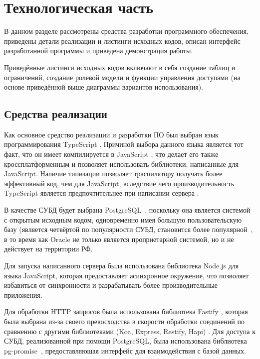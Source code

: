 \section{\large Технологическая часть}

В  данном  разделе  рассмотрены  средства  разработки  программного
обеспечения, приведены детали реализации и листинги исходных кодов, описан интерфейс разработанной программы и приведена демонстрация работы.

Приведённые листинги исходных кодов включают в себя создание таблиц и ограничений, создание ролевой модели и функции управления доступами (на основе приведённой выше диаграммы вариантов использования).

\subsection{Средства реализации}
Как  основное  средство  реализации  и  разработки  ПО  был  выбран  язык программирования  TypeScript \cite{ts}.
Причиной  выбора  данного  языка  является  тот факт,  что  он  имеет компилируется в JavaScript \cite{js}, что делает его также кроссплатформенным и позволяет использовать библиотеки, написанные для JavaScript.
Наличие типизации позволяет траспилятору получать более эффективный код, чем для JavaScript, вследствие чего производительность TypeScript является предпочтительнее при написании сервера \cite{ts-vs-js}.

В качестве СУБД будет выбрана PostgreSQL~\cite{postgres}, поскольку она является системой с открытым исходным кодом, одновременно имея большую пользовательскую базу (является четвёртой по популярности СУБД, становится более популярной~\cite{db-engine}, в то время как Oracle не только является проприетарной системой, но и не действует на территории РФ. 

Для запуска написанного сервера была использована библиотека Node.js \cite{nodejs} для языка JavaScript, которая предоставляет асинхронное окружение, что позволяет избавиться от синхронности и разрабатывать более производительные приложения.

Для обработки HTTP запросов была использована библиотека Fastify \cite{fastify}, которая была выбрана из-за своего превосходства в скорости обработки соединений по сравнению с другими библиотеками (Koa, Express, Restify, Hapi) \cite{fastify-b}.
Для доступа к СУБД, реализованной при помощи PostgreSQL, была использована библиотека pg-promise~\cite{pg-promise}, предоставляющая интерфейс для взаимодействия с базой данных.

